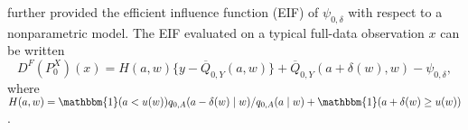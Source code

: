 \citet{diaz2012population} further provided the efficient influence function
(EIF) of $\psi_{0,\delta}$ with respect to a nonparametric model. The EIF
evaluated on a typical full-data observation $x$ can be written
\begin{equation}\label{eqn:eif_full} D^F(P_0^X)(x) = H(a, w)\{y
- \overline{Q}_{0,Y}(a, w)\} + \overline{Q}_{0,Y}(a + \delta(w), w)
- \psi_{0,\delta},
\end{equation} where $H(a, w) = \mathbbm{1}(a < u(w)) q_{0, A}(a - \delta(w)
\mid w)/q_{0, A}(a \mid w) + \mathbbm{1}(a + \delta(w) \geq u(w))$.




